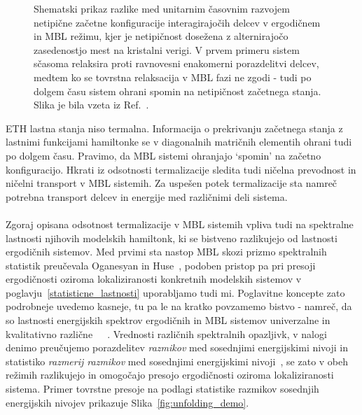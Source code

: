 \begin{minipage}[t]{0.53\textwidth}
\begin{figure}[H]
\caption{
Shematski prikaz razlike med unitarnim časovnim razvojem netipične začetne konfiguracije interagirajočih delcev v ergodičnem in MBL režimu, kjer je netipičnost dosežena z alternirajočo zasedenostjo mest na kristalni verigi.
 V prvem primeru sistem sčasoma relaksira proti ravnovesni enakomerni porazdelitvi delcev, medtem ko se tovrstna relaksacija v MBL fazi ne zgodi - tudi po dolgem času sistem ohrani spomin na netipičnost začetnega stanja. Slika je bila vzeta iz Ref.~\cite{abanin2018ergodicity}. 
}
\label{fig:abanin_thermalization}
\end{figure}
\end{minipage}
ETH lastna stanja niso termalna. Informacija o prekrivanju začetnega stanja z lastnimi funkcijami hamiltonke se v diagonalnih matričnih elementih ohrani tudi po dolgem
  času. Pravimo, da MBL sistemi ohranjajo `spomin' na začetno konfiguracijo. Hkrati iz odsotnosti termalizacije sledita tudi ničelna prevodnost in ničelni transport v MBL sistemih. Za uspešen potek termalizacije sta namreč potrebna transport delcev in energije med različnimi deli sistema. \\\\
Zgoraj opisana odsotnost termalizacije v MBL sistemih vpliva tudi na spektralne lastnosti njihovih modelskih hamiltonk, ki se bistveno razlikujejo od lastnosti ergodičnih sistemov. Med prvimi sta nastop MBL skozi prizmo spektralnih statistik preučevala Oganesyan in Huse~\cite{PhysRevB.75.155111}, podoben pristop pa pri presoji ergodičnosti oziroma lokaliziranosti konkretnih modelskih sistemov v poglavju~\ref{statisticne_lastnosti} uporabljamo tudi mi. Poglavitne koncepte zato podrobneje uvedemo kasneje, tu pa le na kratko povzamemo bistvo - namreč, da so lastnosti energijskih spektrov ergodičnih in MBL sistemov univerzalne in kvalitativno različne~\cite{mehta2004random}~\cite{Atas_Distribution_PhysRevLett.110.084101}~\cite{d2016quantum}. Vrednosti različnih spektralnih opazljivk, v nalogi denimo preučujemo porazdelitev \emph{razmikov} med sosednjimi energijskimi nivoji in statistiko \emph{razmerij razmikov} med sosednjimi energijskimi nivoji~\cite{PhysRevB.75.155111}, se zato v obeh režimih razlikujejo in omogočajo presojo ergodičnosti oziroma lokaliziranosti sistema. Primer tovrstne presoje na podlagi statistike razmikov sosednjih energijskih nivojev prikazuje Slika~\ref{fig:unfolding_demo}.
